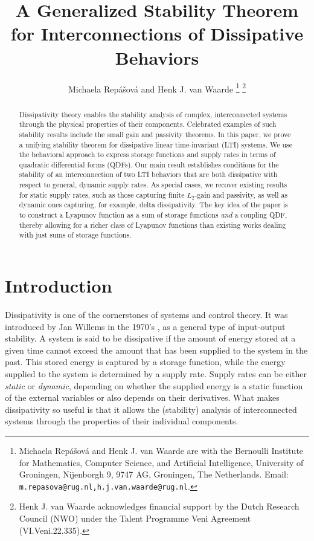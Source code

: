 \documentclass[letterpaper, 10 pt, conference]{ieeeconf}
\theoremstyle{ieeeconf}
\begin{document}
\title{\LARGE \bf A Generalized Stability Theorem for Interconnections of Dissipative Behaviors}
\author{Michaela Repášová and Henk J. van Waarde%
\thanks{Michaela Repášová and Henk J. van Waarde are with the Bernoulli Institute for Mathematics, Computer Science, and Artificial Intelligence, University of Groningen, Nij\-enborgh 9, 9747 AG, Groningen, The Netherlands. Email: {\tt\small m.repasova@rug.nl,h.j.van.waarde@rug.nl}.
}%
\thanks{
	Henk J. van Waarde acknowledges financial support by the Dutch Research Council (NWO) under the Talent Programme Veni Agreement (VI.Veni.22.335).
}%
}

\maketitle
\thispagestyle{empty}
\pagestyle{empty}


\begin{abstract}
Dissipativity theory enables the stability analysis of complex, interconnected systems through the physical properties of their components. Celebrated examples of such stability results include the small gain and passivity theorems. In this paper, we prove a unifying stability theorem for dissipative linear time-invariant (LTI) systems. We use the behavioral approach to express storage functions and supply rates in terms of quadratic differential forms (QDFs). Our main result establishes conditions for the stability of an interconnection of two LTI behaviors that are both dissipative with respect to general, dynamic supply rates. As special cases, we recover existing results for static supply rates, such as those capturing finite $L_2$-gain and passivity, as well as dynamic ones capturing, for example, delta dissipativity. 
The key idea of the paper is to construct a Lyapunov function as a sum of storage functions \emph{and} a coupling QDF, thereby allowing for a richer class of Lyapunov functions than existing works dealing with just sums of storage functions.
\end{abstract}

\section{Introduction}
Dissipativity is one of the cornerstones of systems and control theory. It was introduced by Jan Willems in the 1970's \cite{willems_dissipative_1972,willems_dissipative_1972-1}, as a general type of input-output stability. A system is said to be dissipative if the amount of energy stored at a given time cannot exceed the amount that has been supplied to the system in the past. This stored energy is captured by a storage function, while the energy supplied to the system is determined by a supply rate. 
Supply rates can be either \emph{static} or \emph{dynamic}, depending on whether the supplied energy is a static function of the external variables or also depends on their derivatives.
What makes dissipativity so useful is that it allows the (stability) analysis of interconnected systems through the
properties of their individual components.
\end{document}
